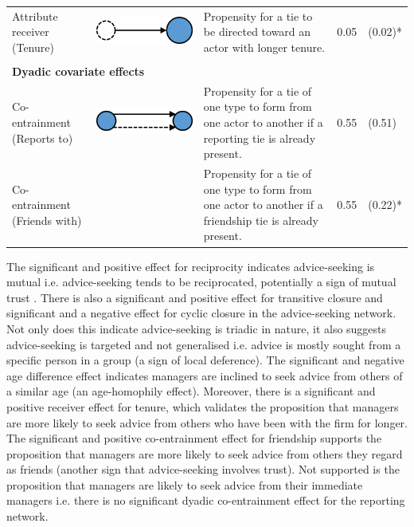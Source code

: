 \begin{landscape}
\begin{table}[]
\begin{tabular}{lcp{10cm}rl}
            Attribute receiver (Tenure) & \begin{minipage}{.2\textwidth} \centering \includegraphics[width=0.45\linewidth]{Images/Receiver} \end{minipage} & Propensity for a tie to be directed toward an actor with longer tenure. & 0.05 & (0.02)* \\ \\
            \multicolumn{5}{l}{\textbf{Dyadic covariate effects}} \\
            Co-entrainment (Reports to) & \begin{minipage}{.2\textwidth} \centering \vspace{0.5cm}\includegraphics[width=0.45\linewidth]{Images/DyadicCovariate} \end{minipage} & Propensity for a tie of one type to form from one actor to another if a reporting tie is already present. & 0.55 & (0.51) \\
            Co-entrainment (Friends with) &  & Propensity for a tie of one type to form from one actor to another if a friendship tie is already present. & 0.55 & (0.22)* \\ \bottomrule
        \end{tabular}
    \end{table}
\end{landscape}

The significant and positive effect for reciprocity indicates advice-seeking is mutual i.e. advice-seeking tends to be reciprocated, potentially a sign of mutual trust \citep{blau1964exchange,axelrod1984evolution}. There is also a significant and positive effect for transitive closure and significant and a negative effect for cyclic closure in the advice-seeking network. Not only does this indicate advice-seeking is triadic in nature, it also suggests advice-seeking is targeted and not generalised i.e. advice is mostly sought from a specific person in a group (a sign of local deference). The significant and negative age difference effect indicates managers are inclined to seek advice from others of a similar age (an age-homophily effect). Moreover, there is a significant and positive receiver effect for tenure, which validates the proposition that managers are more likely to seek advice from others who have been with the firm for longer. The significant and positive co-entrainment effect for friendship supports the proposition that managers are more likely to seek advice from others they regard as friends (another sign that advice-seeking involves trust). Not supported is the proposition that managers are likely to seek advice from their immediate managers i.e. there is no significant dyadic co-entrainment effect for the reporting network. \medskip


